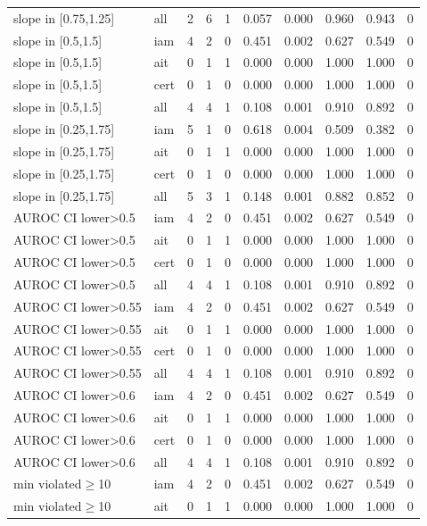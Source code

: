\begin{table}[!ht]
{\begin{tabular}{llllllllll}
slope in [0.75,1.25] & all & 2 & 6 & 1 & 0.057 & 0.000 & 0.960 & 0.943 & 0 \\
slope in [0.5,1.5] & iam & 4 & 2 & 0 & 0.451 & 0.002 & 0.627 & 0.549 & 0 \\
slope in [0.5,1.5] & ait & 0 & 1 & 1 & 0.000 & 0.000 & 1.000 & 1.000 & 0 \\
slope in [0.5,1.5] & cert & 0 & 1 & 0 & 0.000 & 0.000 & 1.000 & 1.000 & 0 \\
slope in [0.5,1.5] & all & 4 & 4 & 1 & 0.108 & 0.001 & 0.910 & 0.892 & 0 \\
slope in [0.25,1.75] & iam & 5 & 1 & 0 & 0.618 & 0.004 & 0.509 & 0.382 & 0 \\
slope in [0.25,1.75] & ait & 0 & 1 & 1 & 0.000 & 0.000 & 1.000 & 1.000 & 0 \\
slope in [0.25,1.75] & cert & 0 & 1 & 0 & 0.000 & 0.000 & 1.000 & 1.000 & 0 \\
slope in [0.25,1.75] & all & 5 & 3 & 1 & 0.148 & 0.001 & 0.882 & 0.852 & 0 \\
AUROC CI lower>0.5 & iam & 4 & 2 & 0 & 0.451 & 0.002 & 0.627 & 0.549 & 0 \\
AUROC CI lower>0.5 & ait & 0 & 1 & 1 & 0.000 & 0.000 & 1.000 & 1.000 & 0 \\
AUROC CI lower>0.5 & cert & 0 & 1 & 0 & 0.000 & 0.000 & 1.000 & 1.000 & 0 \\
AUROC CI lower>0.5 & all & 4 & 4 & 1 & 0.108 & 0.001 & 0.910 & 0.892 & 0 \\
AUROC CI lower>0.55 & iam & 4 & 2 & 0 & 0.451 & 0.002 & 0.627 & 0.549 & 0 \\
AUROC CI lower>0.55 & ait & 0 & 1 & 1 & 0.000 & 0.000 & 1.000 & 1.000 & 0 \\
AUROC CI lower>0.55 & cert & 0 & 1 & 0 & 0.000 & 0.000 & 1.000 & 1.000 & 0 \\
AUROC CI lower>0.55 & all & 4 & 4 & 1 & 0.108 & 0.001 & 0.910 & 0.892 & 0 \\
AUROC CI lower>0.6 & iam & 4 & 2 & 0 & 0.451 & 0.002 & 0.627 & 0.549 & 0 \\
AUROC CI lower>0.6 & ait & 0 & 1 & 1 & 0.000 & 0.000 & 1.000 & 1.000 & 0 \\
AUROC CI lower>0.6 & cert & 0 & 1 & 0 & 0.000 & 0.000 & 1.000 & 1.000 & 0 \\
AUROC CI lower>0.6 & all & 4 & 4 & 1 & 0.108 & 0.001 & 0.910 & 0.892 & 0 \\
min violated$\ge$10 & iam & 4 & 2 & 0 & 0.451 & 0.002 & 0.627 & 0.549 & 0 \\
min violated$\ge$10 & ait & 0 & 1 & 1 & 0.000 & 0.000 & 1.000 & 1.000 & 0 \\

\end{tabular}}
\end{table}

